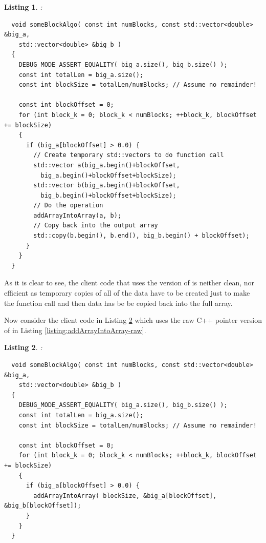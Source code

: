 \documentclass[pdf,ps2pdf,11pt]{SANDreport}
\newtheorem{listing}{Listing}
\begin{document}
\begin{listing}:\\
\label{listing:someBlockAlgo-std-vector}
{\small\begin{verbatim}
  void someBlockAlgo( const int numBlocks, const std::vector<double> &big_a,
    std::vector<double> &big_b )
  {
    DEBUG_MODE_ASSERT_EQUALITY( big_a.size(), big_b.size() );
    const int totalLen = big_a.size();
    const int blockSize = totalLen/numBlocks; // Assume no remainder!
    
    const int blockOffset = 0;
    for (int block_k = 0; block_k < numBlocks; ++block_k, blockOffset += blockSize)
    {
      if (big_a[blockOffset] > 0.0) {
        // Create temporary std::vectors to do function call
        std::vector a(big_a.begin()+blockOffset,
          big_a.begin()+blockOffset+blockSize);
        std::vector b(big_a.begin()+blockOffset,
          big_b.begin()+blockOffset+blockSize);
        // Do the operation
        addArrayIntoArray(a, b);
        // Copy back into the output array
        std::copy(b.begin(), b.end(), big_b.begin() + blockOffset);
      }
    }
  }
\end{verbatim}}
\end{listing}

As it is clear to see, the client code that uses the
{} version of {} is
neither clean, nor efficient as temporary copies of all of the data
have to be created just to make the function call and then data has be
be copied back into the full array.

Now consider the client code in Listing
{}\ref{listing:someBlockAlgo-std-vector-raw-ptr} which uses the raw C++
pointer version of {} in Listing
{}\ref{listing:addArrayIntoArray-raw}.

\begin{listing}:\\
\label{listing:someBlockAlgo-std-vector-raw-ptr}
{\small\begin{verbatim}
  void someBlockAlgo( const int numBlocks, const std::vector<double> &big_a,
    std::vector<double> &big_b )
  {
    DEBUG_MODE_ASSERT_EQUALITY( big_a.size(), big_b.size() );
    const int totalLen = big_a.size();
    const int blockSize = totalLen/numBlocks; // Assume no remainder!
    
    const int blockOffset = 0;
    for (int block_k = 0; block_k < numBlocks; ++block_k, blockOffset += blockSize)
    {
      if (big_a[blockOffset] > 0.0) {
        addArrayIntoArray( blockSize, &big_a[blockOffset], &big_b[blockOffset]);
      }
    }
  }
\end{verbatim}}
\end{listing}
\end{document}
